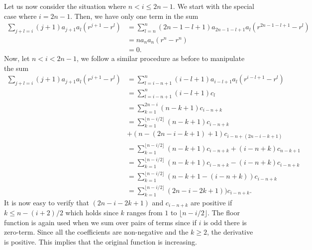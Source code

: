 \documentclass[12pt]{article}
\newcommand{\Le}{\left(}
\newcommand{\Ri}{\right)}
\begin{document}
Let us now consider the situation where $n < i \leq 2n-1$. We start with the special case where $i = 2n-1$. Then, we have only one term in the sum
\begin{align*}
\sum_{j+l = i}(j+1)a_{j+1}a_l  (r^{j+1}- r^l) &= \sum_{l=n}^{n}(2n-1-l+1)a_{2n-1-l+1}a_l  (r^{2n-1-l+1}- r^l) \\
&= na_{n}a_n  (r^{n}- r^n) \\
& = 0.
\end{align*}Now, let $n < i < 2n-1$, we follow a similar procedure as before to manipulate the sum
\begin{align*}
\sum_{j+l = i}(j+1)a_{j+1}a_l  (r^{j+1}- r^l) &= \sum_{l=i-n + 1}^{n}(i-l+1)a_{i-l+1}a_l  (r^{i-l+1}- r^l) \\
& = \sum_{l=i-n + 1}^{n}(i-l+1)c_l \\
& = \sum_{k=1}^{2n-i}(n-k+1)c_{i-n+k} \\
& = \sum_{k=1}^{\lfloor n - i/2 \rfloor}(n-k+1)c_{i-n+k}\\
&+  (n-(2n-i-k+1)+1)c_{i-n+(2n-i-k+1)} \\
&= \sum_{k=1}^{\lfloor n - i/2 \rfloor}(n-k+1)c_{i-n+k} +  (i-n+k)c_{n-k+1} \\
&= \sum_{k=1}^{\lfloor n - i/2 \rfloor}(n-k+1)c_{i-n+k} -  (i-n+k)c_{i-n+k} \\
&= \sum_{k=1}^{\lfloor n - i/2 \rfloor}(n-k+1-(i-n+k))c_{i-n+k} \\
&= \sum_{k=1}^{\lfloor n - i/2 \rfloor}(2n-i-2k+1))c_{i-n+k}.
\end{align*}It is now easy to verify that $(2n-i-2k+1)$ and $c_{i-n+k}$ are positive if $k \leq n - (i+2)/2$ which holds since $k$ ranges from $1$ to $\lfloor n - i/2 \rfloor$. The floor function is again used when we sum over pairs of terms since if $i$ is odd there is zero-term. 
Since all the coefficients are non-negative and the $k \geq 2$, the derivative is positive. This implies that the original function is increasing.


\end{document}
